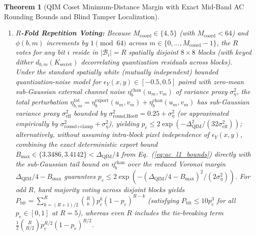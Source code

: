 \documentclass[conference,10pt]{IEEEtran}
\newtheorem{theorem}{Theorem}
\begin{document}
\begin{theorem}[QIM Coset Minimum-Distance Margin with Exact Mid-Band AC Rounding Bounds and Blind Tamper Localization]
\begin{enumerate}
    \begin{equation}
    \label{eq:ac_l1_bounds}
    \resizebox{0.87\columnwidth}{!}{$\displaystyle
    \begin{aligned}
    \max_{(u_m,v_m) \in \mathcal{M}_4} |\eta^{\text{export}}_b(u_m,v_m)| &= \tfrac{1}{2}\|c_2\|_1 \|c_3\|_1 \approx 3.3486 < 3.5, \\
    \max_{(u_m,v_m) \in \mathcal{M}_5} |\eta^{\text{export}}_b(u_m,v_m)| &= \tfrac{1}{2}\|c_2\|_1^2 = 2 + \sqrt{2} \approx 3.4142 < 3.5.
    \end{aligned}
    $}
    \end{equation}
    Hence interior $\mathrm{uint8}$ rounding alone can never flip a single watermarked AC coefficient ($p_e^{\text{export}} = 0$). Under uniform quantization noise $\epsilon_Y \sim \mathrm{Unif}[-0.5, 0.5]$, orthonormality of $C_8$ yields theoretical interior rounding variance $\sigma_{\text{round}}^2 = 1/12 \approx 0.0833$ ($\mathrm{RMS} \approx 0.2887$; empirical $\sigma_{\text{round+clamp}}^2 = 0.0821 \ll 12.25$).
    \item \textbf{$R$-Fold Repetition Voting:} Because $M_{\text{coord}} \in \{4, 5\}$ (with $M_{\text{coord}} < 64$) and $\phi(b,m)$ increments by $1 \pmod{64}$ across $m \in \{0,\dots,M_{\text{coord}}-1\}$, the $R$ votes for any bit $i$ reside in $|\mathcal{B}_i| = R$ spatially disjoint $8\times 8$ blocks (with keyed dither $d_{b,m}(K_{\text{secret}})$ decorrelating quantization residuals across blocks). Under the standard spatially white (mutually independent) bounded quantization-noise model for $\epsilon_Y(x,y) \in [-0.5, 0.5]$ paired with zero-mean sub-Gaussian external channel noise $\eta^{\text{chan}}_b(u_m,v_m)$ of variance proxy $\sigma_\eta^2$, the total perturbation $\eta^{\text{tot}}_{b,m} = \eta^{\text{export}}_b(u_m,v_m) + \eta^{\text{chan}}_b(u_m,v_m)$ has sub-Gaussian variance proxy $\sigma_{\text{eff}}^2$ bounded by $\sigma_{\text{round,Hoeff}}^2 = 0.25 + \sigma_\eta^2$ (or approximated empirically by $\sigma_{\text{round+clamp}}^2 + \sigma_\eta^2$), yielding $p_e \le 2\exp(-\Delta_{\text{QIM}}^2 / (32 \sigma_{\text{eff}}^2))$; alternatively, without assuming intra-block pixel independence of $\epsilon_Y(x,y)$, combining the exact deterministic export bound $B_{\max} \in \{3.3486, 3.4142\} < \Delta_{\text{QIM}}/4$ from Eq.~(\ref{eq:ac_l1_bounds}) directly with the sub-Gaussian tail bound on $\eta^{\text{chan}}_b$ over the reduced Voronoi margin $\Delta_{\text{QIM}}/4 - B_{\max}$ guarantees $p_e \le 2\exp(-(\Delta_{\text{QIM}}/4 - B_{\max})^2 / (2\sigma_\eta^2))$. For odd $R$, hard majority voting across disjoint blocks yields $P_{\text{bit}} = \sum_{k=(R+1)/2}^R \binom{R}{k} p_e^k (1 - p_e)^{R-k}$ (satisfying $P_{\text{bit}} \le 10 p_e^3$ for all $p_e \in [0, 1]$ at $R=5$), whereas even $R$ includes the tie-breaking term $\frac{1}{2}\binom{R}{R/2}p_e^{R/2}(1-p_e)^{R/2}$.

\end{enumerate}
\end{theorem}
\end{document}
